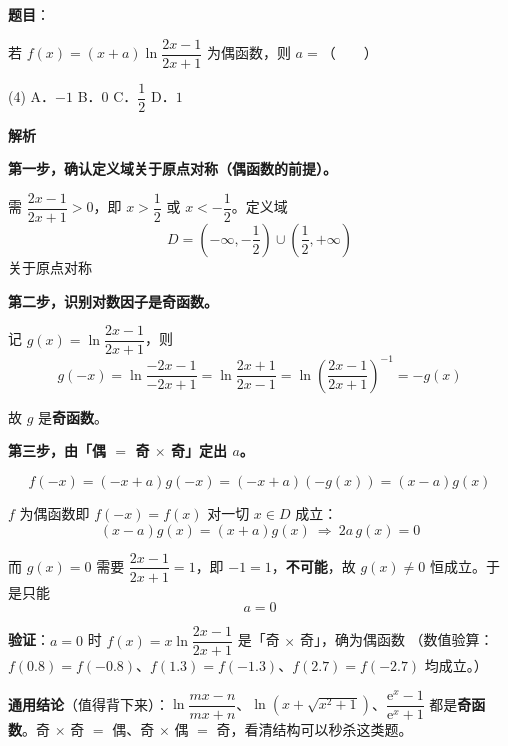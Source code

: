 \begin{answer}

\textbf{题目}：

若 $f(x)=(x+a)\ln\dfrac{2x-1}{2x+1}$ 为偶函数，则 $a=$\mbox{（　　）}

\begin{gkopts}(4)
\task A．$-1$
\task B．$0$
\task C．$\dfrac12$
\task D．$1$
\end{gkopts}

\textbf{解析}

\textbf{第一步，确认定义域关于原点对称（偶函数的前提）。}

需 $\dfrac{2x-1}{2x+1}>0$，即 $x>\dfrac12$ 或 $x<-\dfrac12$。定义域
\nopagebreak[4]
\[D=\left(-\infty,-\frac12\right)\cup\left(\frac12,+\infty\right)\]
关于原点对称 

\textbf{第二步，识别对数因子是奇函数。}

记 $g(x)=\ln\dfrac{2x-1}{2x+1}$，则
\nopagebreak[4]
\[g(-x)=\ln\frac{-2x-1}{-2x+1}=\ln\frac{2x+1}{2x-1}=\ln\left(\frac{2x-1}{2x+1}\right)^{-1}=-g(x)\]

故 $g$ 是\textbf{奇函数}。

\textbf{第三步，由「偶 $=$ 奇 $\times$ 奇」定出 $a$。}

\nopagebreak[4]
\[f(-x)=(-x+a)g(-x)=(-x+a)\left(-g(x)\right)=(x-a)g(x)\]

$f$ 为偶函数即 $f(-x)=f(x)$ 对一切 $x\in D$ 成立：
\nopagebreak[4]
\[(x-a)g(x)=(x+a)g(x)\ \Longrightarrow\ 2a\,g(x)=0\]

而 $g(x)=0$ 需要 $\dfrac{2x-1}{2x+1}=1$，即 $-1=1$，\textbf{不可能}，故 $g(x)\ne0$ 恒成立。于是只能
\nopagebreak[4]
\[a=0\]

\textbf{验证}：$a=0$ 时 $f(x)=x\ln\dfrac{2x-1}{2x+1}$ 是「奇 $\times$ 奇」，确为偶函数 （数值验算：$f(0.8)=f(-0.8)$、$f(1.3)=f(-1.3)$、$f(2.7)=f(-2.7)$ 均成立。）

\begin{gktip}
\textbf{通用结论}（值得背下来）：$\ln\dfrac{mx-n}{mx+n}$、$\ln\left(x+\sqrt{x^{2}+1}\right)$、$\dfrac{\mathrm e^{x}-1}{\mathrm e^{x}+1}$ 都是\textbf{奇函数}。奇 $\times$ 奇 $=$ 偶、奇 $\times$ 偶 $=$ 奇，看清结构可以秒杀这类题。
\end{gktip}


\par\medskip

\end{answer}

